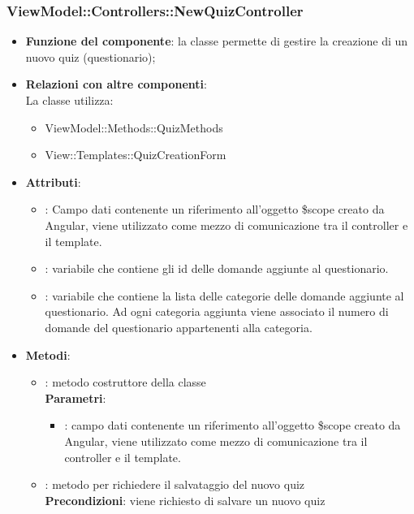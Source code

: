 \subsubsection{ViewModel::Controllers::NewQuizController}
\begin{itemize}
\item\textbf{Funzione del componente}: la classe permette di gestire la creazione di un nuovo quiz (questionario);
\item\textbf{Relazioni con altre componenti}: \\
La classe utilizza:
	\begin{itemize}
		\item ViewModel::Methods::QuizMethods
		\item View::Templates::QuizCreationForm
	\end{itemize}
\item\textbf{Attributi}:
	\begin{itemize}
		\item{}: Campo dati contenente un riferimento all'oggetto \$scope creato da Angular, viene utilizzato come mezzo di comunicazione tra il controller e il template.
		\item{}: variabile che contiene gli id delle domande aggiunte al questionario.
		\item{}: variabile che contiene la lista delle categorie delle domande aggiunte al questionario. Ad ogni categoria aggiunta viene associato il numero di domande del questionario appartenenti alla categoria.
	\end{itemize}
\item\textbf{Metodi}:
	\begin{itemize}
		\item{}: metodo costruttore della classe\\	
		\textbf{Parametri}:
			\begin{itemize}
				\item{}: campo dati contenente un riferimento all'oggetto \$scope creato da Angular, viene utilizzato come mezzo di comunicazione tra il controller e il template.\\
			\end{itemize}
		\item{}: metodo per richiedere il salvataggio del nuovo quiz\\
		\textbf{Precondizioni}: viene richiesto di salvare un nuovo quiz\\

\end{itemize}
\end{itemize}
